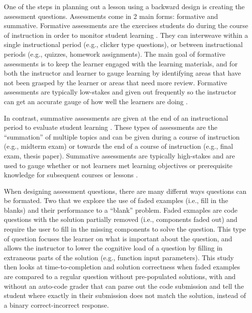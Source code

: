 \documentclass[040-assessment.tex]{subfiles}
\begin{document}
One of the steps in planning out a lesson using a backward design is creating the assessment questions.
Assessments come in 2 main forms: formative and summative.
Formative assessments are the exercises students do during the course of instruction
in order to monitor student learning
\cite{universityFormativeVsSummative, wilson2019teaching}.
They can interweave within a single instructional period (e.g., clicker type questions),
or between instructional periods (e.g., quizzes, homework assignments).
The main goal of formative assessments is to keep the learner engaged with the learning materials,
and for both the instructor and learner to gauge learning by identifying areas that have not been grasped by the
learner or areas that need more review.
Formative assessments are typically low-stakes and given out frequently so the instructor
can get an accurate gauge of how well the learners are doing
\cite{universityFormativeVsSummative, wilson2019teaching}.

In contrast, summative assessments are given at the end of an instructional period
to evaluate student learning
\cite{universityFormativeVsSummative, wilson2019teaching}.
These types of assessments are the ``summation'' of multiple topics and can be given
during a course of instruction (e.g., midterm exam)
or towards the end of a course of instruction (e.g., final exam, thesis paper).
Summative assessments are typically high-stakes and
are used to gauge whether or not learners met learning objectives or
prerequisite knowledge for subsequent courses or lessons
\cite{universityFormativeVsSummative, wilson2019teaching}.

When designing assessment questions, there are many differnt ways questions can be formated.
Two that we explore the use of faded examples (i.e., fill in the blanks)
and their performance to a ``blank'' problem.
Faded exmaples are code questions with the solution partially removed (i.e., components faded out)
and require the user to fill in the missing components to solve the question.
This type of question focuses the learner on what is important about the question,
and allows the instructor to lower the cognitive load of a question by filling in
extraneous parts of the solution (e.g., function input parameters).
This study then looks at time-to-completion and solution correctness
when faded examples are compared to a regular question without pre-populated solutions,
with and without an auto-code grader that can parse out the code submission and
tell the student where
exactly in their submission does not match the solution,
instead of a binary correct-incorrect response.
\end{document}
